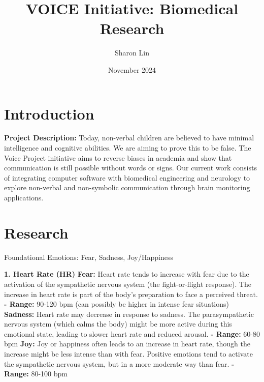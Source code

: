 \documentclass[12pt, research paper]{report}
\title{VOICE Initiative: Biomedical Research}
\author{Sharon Lin}
\date{November 2024}
\begin{document}
	
	\maketitle
	
	\section*{Introduction}
	
	\noindent\textbf{Project Description:} Today, non-verbal children are believed to have minimal intelligence and cognitive abilities. We are aiming to prove this to be false. The Voice Project initiative aims to reverse biases in academia and show that communication is still possible without words or signs. Our current work consists of integrating computer software with biomedical engineering and neurology to explore non-verbal and non-symbolic communication through brain monitoring applications.
	
	\vspace{10pt}
	
	\section*{Research} 
	Foundational Emotions: Fear, Sadness, Joy/Happiness

	\noindent \textbf{1. Heart Rate (HR)}
	\newline \textbf{Fear:} Heart rate tends to increase with fear due to the activation of the sympathetic nervous system (the fight-or-flight response). The increase in heart rate is part of the body's preparation to face a perceived threat. 
	\newline \textbf{- Range:} 90-120 bpm (can possibly be higher in intense fear situations)
	\newline \textbf{Sadness:} Heart rate may decrease in response to sadness. The parasympathetic nervous system (which calms the body) might be more active during this emotional state, leading to slower heart rate and reduced arousal.
	\newline \textbf{- Range:} 60-80 bpm
	\newline \textbf{Joy:} Joy or happiness often leads to an increase in heart rate, though the increase might be less intense than with fear. Positive emotions tend to activate the sympathetic nervous system, but in a more moderate way than fear.
	\newline \textbf{- Range:} 80-100 bpm
	\bigskip 
	
\end{document}

